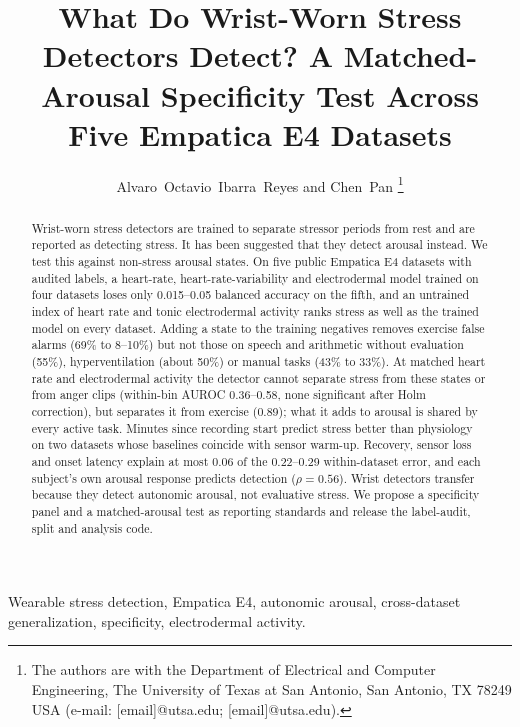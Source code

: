 \documentclass[journal]{IEEEtran}
\begin{document}
\title{What Do Wrist-Worn Stress Detectors Detect? A Matched-Arousal Specificity Test Across Five Empatica E4 Datasets}

\author{Alvaro~Octavio~Ibarra~Reyes and Chen~Pan%
\thanks{The authors are with the Department of Electrical and Computer Engineering, The University of Texas at San Antonio, San Antonio, TX 78249 USA (e-mail: [email]@utsa.edu; [email]@utsa.edu).}}


\maketitle

\begin{abstract}
Wrist-worn stress detectors are trained to separate stressor periods from rest and are reported as detecting stress. It has been suggested that they detect arousal instead. We test this against non-stress arousal states. On five public Empatica E4 datasets with audited labels, a heart-rate, heart-rate-variability and electrodermal model trained on four datasets loses only 0.015--0.05 balanced accuracy on the fifth, and an untrained index of heart rate and tonic electrodermal activity ranks stress as well as the trained model on every dataset. Adding a state to the training negatives removes exercise false alarms (69\% to 8--10\%) but not those on speech and arithmetic without evaluation (55\%), hyperventilation (about 50\%) or manual tasks (43\% to 33\%). At matched heart rate and electrodermal activity the detector cannot separate stress from these states or from anger clips (within-bin AUROC 0.36--0.58, none significant after Holm correction), but separates it from exercise (0.89); what it adds to arousal is shared by every active task. Minutes since recording start predict stress better than physiology on two datasets whose baselines coincide with sensor warm-up. Recovery, sensor loss and onset latency explain at most 0.06 of the 0.22--0.29 within-dataset error, and each subject's own arousal response predicts detection ($\rho=0.56$). Wrist detectors transfer because they detect autonomic arousal, not evaluative stress. We propose a specificity panel and a matched-arousal test as reporting standards and release the label-audit, split and analysis code.
\end{abstract}

\begin{IEEEkeywords}
Wearable stress detection, Empatica E4, autonomic arousal, cross-dataset generalization, specificity, electrodermal activity.
\end{IEEEkeywords}
\end{document}
